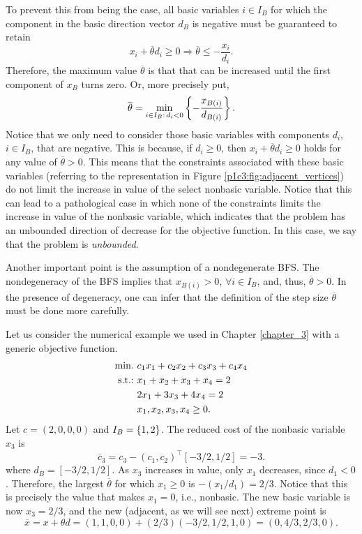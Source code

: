 To prevent this from being the case, all basic variables $i \in I_B$ for which the component in the basic direction vector $d_B$ is negative must be guaranteed to retain
%
\begin{equation*}
	x_i + \overline{\theta}d_i \geq 0 \Rightarrow \overline{\theta} \leq -\frac{x_i}{d_i}.
\end{equation*}
%
Therefore, the maximum value $\overline{\theta}$ is that that can be increased until the first component of $x_B$ turns zero. Or, more precisely put, 
%
\begin{equation*}
	\overline{\theta} = \min_{i \in I_B : \, d_i < 0} \left\{ -\frac{x_{B(i)}}{d_{B(i)}} \right \}.
\end{equation*}
%
Notice that we only need to consider those basic variables with components $d_i$, $i \in I_B$, that are negative. This is because, if $d_i \ge 0$, then $x_i + \overline{\theta}d_i \geq 0$ holds for any value of $\overline{\theta} > 0$. This means that the constraints associated with these basic variables (referring to the representation in Figure \ref{p1c3:fig:adjacent_vertices}) do not limit the increase in value of the select nonbasic variable. Notice that this can lead to a pathological case in which none of the constraints limits the increase in value of the nonbasic variable, which indicates that the problem has an unbounded direction of decrease for the objective function. In this case, we say that the problem is \emph{unbounded}.

Another important point is the assumption of a nondegenerate BFS. The nondegeneracy of the BFS implies that  $x_{B(i)} > 0$, $\forall i \in I_B$, and, thus, $\overline{\theta} > 0$. In the presence of degeneracy, one can infer that the definition of the step size $\overline{\theta}$ must be done more carefully.

Let us consider the numerical example we used in Chapter \ref{chapter_3} with a generic objective function. 
%
\begin{align*}
	\mathop{\text{min.~}} & c_1x_1 + c_2x_2 + c_3x_3 + c_4x_4 \\	
	\mathop{\text{s.t.:~}} & x_1 + x_2 + x_3 + x_4 = 2 \\
	& 2x_1 + 3x_3 + 4x_4 = 2 \\
	& x_1, x_2 ,x_3, x_4 \geq 0.  
\end{align*}
%
Let $c = (2,0,0,0)$ and $I_B=\left\{ 1,2 \right \} $. The reduced cost of the nonbasic variable $x_3$ is 
%
\begin{equation*}
	\overline{c}_3 = c_3 - (c_1, c_2)^\top [-3/2, 1/2] = -3.	
\end{equation*}
%
where $d_B = [-3/2, 1/2]$. As $x_3$ increases in value, only $x_1$ decreases, since $d_1 < 0$. Therefore, the largest $\overline{\theta}$ for which $x_1\geq 0$ is $-(x_1/d_1)= 2/3$. Notice that this is precisely the value that makes $x_1 = 0$, i.e., nonbasic. The new basic variable is now $x_3 = 2/3$, and the new (adjacent, as we will see next) extreme point is 
%
\begin{equation*}
	\overline{x} = x + \theta d = (1,1,0,0) + (2/3)(-3/2, 1/2, 1, 0) = (0,4/3,2/3,0).	
\end{equation*}



